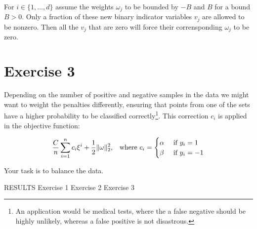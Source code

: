 \documentclass[11pt]{article}
\begin{document}
For $i \in \{ 1, \dots, d \}$ assume the weights $\omega_j$ to be bounded by $-B$ and $B$ for a bound $B > 0$.
Only a fraction of these new binary indicator variables $v_j$ are allowed to be nonzero.
Then all the $v_j$ that are zero will force their corrensponding $\omega_j$ to be zero.

\section*{Exercise 3}

Depending on the number of positive and negative samples in the data we might want to weight the penalties differently, ensuring that points from one of the sets have a higher probability to be classified correctly\footnote{
  An application would be medical tests, where the a false negative should be highly unlikely, whereas a false positive is not disastrous.}.
This correction $c_i$ is applied in the objective function:

$$
\frac{C}{n} \sum\limits_{i = 1}^n c_i \xi^i + \frac{1}{2} \lVert \omega \rVert_2^2
\text{,\quad where } c_i =
\begin{cases}
  \alpha & \text{ if } y_i = 1 \\
  \beta & \text{ if } y_i = -1
\end{cases}
$$

Your task is to balance the data.

RESULTS
Exercise 1
Exercise 2
Exercise 3
\end{document}
